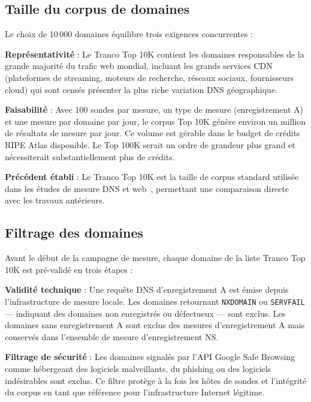 \subsection{Taille du corpus de domaines}
\label{subsec:3.2.2}

Le choix de 10\,000 domaines équilibre trois exigences concurrentes :

\textbf{Représentativité} : Le Tranco Top 10K contient les domaines responsables de la grande majorité du trafic web mondial, incluant les grands services CDN (plateformes de streaming, moteurs de recherche, réseaux sociaux, fournisseurs cloud) qui sont censés présenter la plus riche variation DNS géographique.

\textbf{Faisabilité} : Avec 100 sondes par mesure, un type de mesure (enregistrement A) et une mesure par domaine par jour, le corpus Top 10K génère environ un million de résultats de mesure par jour. Ce volume est gérable dans le budget de crédits RIPE Atlas disponible. Le Top 100K serait un ordre de grandeur plus grand et nécessiterait substantiellement plus de crédits.

\textbf{Précédent établi} : Le Tranco Top 10K est la taille de corpus standard utilisée dans les études de mesure DNS et web~\cite{Calder2015,Wang2018}, permettant une comparaison directe avec les travaux antérieurs.

\subsection{Filtrage des domaines}
\label{subsec:3.2.3}

Avant le début de la campagne de mesure, chaque domaine de la liste Tranco Top 10K est pré-validé en trois étapes :

\textbf{Validité technique} : Une requête DNS d'enregistrement A est émise depuis l'infrastructure de mesure locale. Les domaines retournant \texttt{NXDOMAIN} ou \texttt{SERVFAIL} --- indiquant des domaines non enregistrés ou défectueux --- sont exclus. Les domaines sans enregistrement A sont exclus des mesures d'enregistrement A mais conservés dans l'ensemble de mesure d'enregistrement NS.

\textbf{Filtrage de sécurité} : Les domaines signalés par l'API Google Safe Browsing comme hébergeant des logiciels malveillants, du phishing ou des logiciels indésirables sont exclus. Ce filtre protège à la fois les hôtes de sondes et l'intégrité du corpus en tant que référence pour l'infrastructure Internet légitime.

